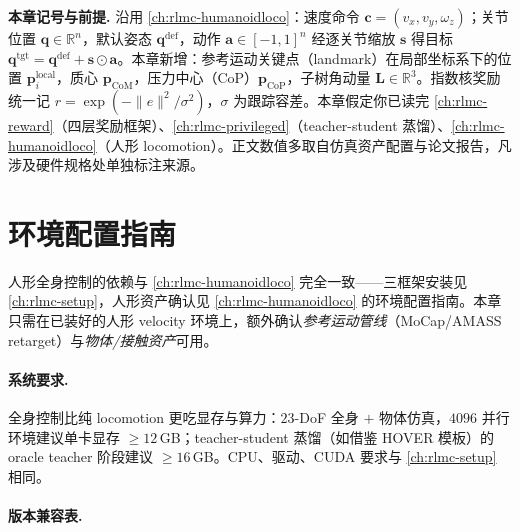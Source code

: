 \begin{note}
\textbf{本章记号与前提.}\;
沿用 \cref{ch:rlmc-humanoidloco}：速度命令 $\mathbf{c}=(v_x,v_y,\omega_z)$；关节位置 $\mathbf{q}\in\mathbb{R}^{n}$，默认姿态 $\mathbf{q}^{\mathrm{def}}$，动作 $\mathbf{a}\in[-1,1]^n$ 经逐关节缩放 $\boldsymbol{s}$ 得目标 $\mathbf{q}^{\mathrm{tgt}}=\mathbf{q}^{\mathrm{def}}+\boldsymbol{s}\odot\mathbf{a}$。本章新增：参考运动关键点（landmark）在局部坐标系下的位置 $\mathbf{p}_i^{\mathrm{local}}$，质心 $\mathbf{p}_{\mathrm{CoM}}$，压力中心（CoP）$\mathbf{p}_{\mathrm{CoP}}$，子树角动量 $\mathbf{L}\in\mathbb{R}^3$。指数核奖励统一记 $r=\exp(-\lVert e\rVert^2/\sigma^2)$，$\sigma$ 为跟踪容差。本章假定你已读完 \cref{ch:rlmc-reward}（四层奖励框架）、\cref{ch:rlmc-privileged}（teacher-student 蒸馏）、\cref{ch:rlmc-humanoidloco}（人形 locomotion）。正文数值多取自仿真资产配置与论文报告，凡涉及硬件规格处单独标注来源。
\end{note}

\section*{环境配置指南}

人形全身控制的依赖与 \cref{ch:rlmc-humanoidloco} 完全一致——三框架安装见 \cref{ch:rlmc-setup}，人形资产确认见 \cref{ch:rlmc-humanoidloco} 的环境配置指南。本章只需在已装好的人形 velocity 环境上，额外确认\emph{参考运动管线}（MoCap/AMASS retarget）与\emph{物体/接触资产}可用。

\paragraph{系统要求.}
全身控制比纯 locomotion 更吃显存与算力：$23$-DoF 全身 $+$ 物体仿真，$4096$ 并行环境建议单卡显存 $\geq 12$\,GB；teacher-student 蒸馏（如借鉴 HOVER 模板）的 oracle teacher 阶段建议 $\geq 16$\,GB。CPU、驱动、CUDA 要求与 \cref{ch:rlmc-setup} 相同。

\paragraph{版本兼容表.}


